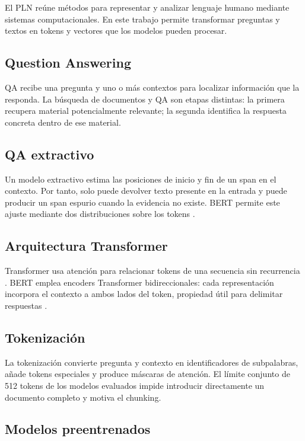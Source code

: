 \documentclass[12pt,letterpaper]{article}
\begin{document}
El PLN reúne métodos para representar y analizar lenguaje humano mediante
sistemas computacionales. En este trabajo permite transformar preguntas y
textos en tokens y vectores que los modelos pueden procesar.

\subsection{Question Answering}

QA recibe una pregunta y uno o más contextos para localizar información que la
responda. La búsqueda de documentos y QA son etapas distintas: la primera
recupera material potencialmente relevante; la segunda identifica la respuesta
concreta dentro de ese material.

\subsection{QA extractivo}

Un modelo extractivo estima las posiciones de inicio y fin de un span en el
contexto. Por tanto, solo puede devolver texto presente en la entrada y puede
producir un span espurio cuando la evidencia no existe. BERT permite este
ajuste mediante dos distribuciones sobre los tokens \cite{devlin2019}.

\subsection{Arquitectura Transformer}

Transformer usa atención para relacionar tokens de una secuencia sin recurrencia
\cite{vaswani2017}. BERT emplea encoders Transformer bidireccionales: cada
representación incorpora el contexto a ambos lados del token, propiedad útil
para delimitar respuestas \cite{devlin2019}.

\subsection{Tokenización}

La tokenización convierte pregunta y contexto en identificadores de
subpalabras, añade tokens especiales y produce máscaras de atención. El límite
conjunto de 512 tokens de los modelos evaluados impide introducir directamente
un documento completo y motiva el chunking.

\subsection{Modelos preentrenados}
\end{document}
